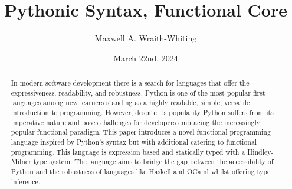 \documentclass{l4proj}
\begin{document}
\title{Pythonic Syntax, Functional Core}
\author{Maxwell A. Wraith-Whiting}
\date{March 22nd, 2024}

\maketitle

\begin{abstract}





    In modern software development there is a search for languages that offer the expressiveness, readability, and robustness.
    Python is one of the most popular first languages among new learners standing as a highly readable, simple, versatile introduction to programming.
    However, despite its popularity Python suffers from its imperative nature and poses challenges for developers embracing the increasingly popular functional paradigm.
    This paper introduces a novel functional programming language inspired by Python’s syntax but with additional catering to functional programming.
    This language is expression based and statically typed with a Hindley-Milner type system.
    The language aims to bridge the gap between the accessibility of Python and the robustness of languages like Haskell and OCaml whilst offering type inference.


\end{abstract}
\end{document}
